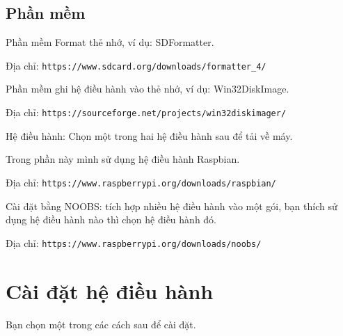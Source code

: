\subsection{Phần mềm}
\begin{list}{--}{}
\item Phần mềm Format thẻ nhớ, ví dụ: SDFormatter.

Địa chỉ: \verb|https://www.sdcard.org/downloads/formatter_4/|
\item Phần mềm ghi hệ điều hành vào thẻ nhớ, ví dụ: Win32DiskImage.

Địa chỉ: \verb|https://sourceforge.net/projects/win32diskimager/|
\item Hệ điều hành: Chọn một trong hai hệ điều hành sau để tải về máy.
\begin{list}{+}{}
\item Trong phần này mình sử dụng hệ điều hành Raspbian.

Địa chỉ: \verb|https://www.raspberrypi.org/downloads/raspbian/|

\item Cài đặt bằng NOOBS: tích hợp nhiều hệ điều hành vào một gói, bạn thích sử dụng hệ điều hành nào thì chọn hệ điều hành đó.

Địa chỉ: \verb|https://www.raspberrypi.org/downloads/noobs/|
\end{list}
\end{list}
\section{Cài đặt hệ điều hành}
Bạn chọn một trong các cách sau để cài đặt.
